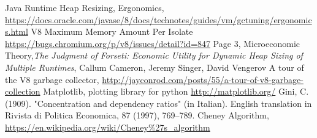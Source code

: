 \documentclass{l4proj}
\begin{document}
\begin{thebibliography}{9}
Java Runtime Heap Resizing, Ergonomics,
\url{https://docs.oracle.com/javase/8/docs/technotes/guides/vm/gctuning/ergonomics.html}
V8 Maximum Memory Amount Per Isolate
\url{https://bugs.chromium.org/p/v8/issues/detail?id=847}
Page 3, Microeconomic Theory,\emph{The Judgment of Forseti: Economic Utility for Dynamic Heap Sizing of Multiple Runtimes}, Callum Cameron, Jeremy Singer, David Vengerov
A tour of the V8 garbage collector,
\url{http://jayconrod.com/posts/55/a-tour-of-v8-garbage-collection}
Matplotlib, plotting library for python
\url{http://matplotlib.org/}
Gini, C. (1909). "Concentration and dependency ratios" (in Italian). English translation in Rivista di Politica Economica, 87 (1997), 769–789.
Cheney Algorithm,
\url{https://en.wikipedia.org/wiki/Cheney\%27s_algorithm}
\end{thebibliography}
\end{document}
